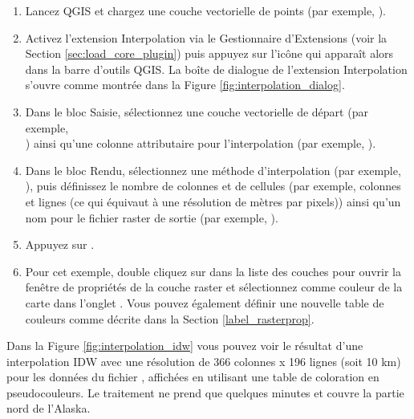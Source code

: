 \begin{enumerate}
  \item Lancez QGIS et chargez une couche vectorielle de points (par 
  exemple, ). 
  \item Activez l'extension Interpolation via le Gestionnaire d'Extensions 
  (voir la Section \ref{sec:load_core_plugin}) puis appuyez sur l'icône
   qui apparaît alors dans la barre 
  d'outils QGIS. La boîte de dialogue de l'extension Interpolation s'ouvre 
  comme montrée dans la Figure \ref{fig:interpolation_dialog}.
  \item Dans le bloc Saisie, sélectionnez une couche vectorielle de départ 
  (par exemple,\\ ) ainsi qu'une colonne 
  attributaire pour l'interpolation (par exemple, ).
  \item Dans le bloc Rendu, sélectionnez une méthode d'interpolation 
  (par exemple,\\ ), puis 
  définissez le nombre de colonnes et de cellules (par exemple,  colonnes 
  et  lignes (ce qui équivaut à une résolution de  mètres par 
  pixels)) ainsi qu'un nom pour le fichier raster de sortie
  (par exemple, ).
  \item Appuyez sur .
  \item Pour cet exemple, double cliquez sur  dans la
  liste des couches pour ouvrir la fenêtre de propriétés de la couche raster 
  et sélectionnez  comme couleur de la 
  carte dans l'onglet . Vous pouvez également définir une 
  nouvelle table de couleurs comme décrite dans la Section \ref{label_rasterprop}.
\end{enumerate}

Dans la Figure \ref{fig:interpolation_idw} vous pouvez voir le résultat d'une
interpolation IDW avec une résolution de 366 colonnes x 196 lignes (soit 
10 km) pour les données du fichier , affichées en utilisant 
une table de coloration en pseudocouleurs. Le traitement ne prend que quelques 
minutes et couvre la partie nord de l'Alaska.

